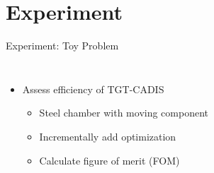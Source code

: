\documentclass{beamer}
\begin{document}
\section{Experiment}
\begin{frame}{Experiment: Toy Problem}
\begin{columns}
	\begin{itemize}
		\item{Assess efficiency of TGT-CADIS}
	\begin{itemize}
		\item{Steel chamber with moving component}
		\item{Incrementally add optimization}
		\item{Calculate figure of merit (FOM) }
	\end{itemize}
	\end{itemize}
\end{columns}
\end{frame}
\end{document}
